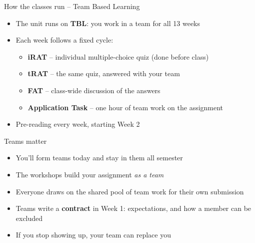 \documentclass[
  ignorenonframetext,
]{beamer}
\providecommand{\tightlist}{%
  \setlength{\itemsep}{0pt}\setlength{\parskip}{0pt}}
\begin{document}
\begin{frame}{How the classes run -- Team Based Learning}
\label{how-the-classes-run-team-based-learning}
\begin{itemize}
\tightlist
\item
  The unit runs on \textbf{TBL}: you work in a team for all 13 weeks
\item
  Each week follows a fixed cycle:

  \begin{itemize}
  \tightlist
  \item
    \textbf{iRAT} -- individual multiple-choice quiz (done before class)
  \item
    \textbf{tRAT} -- the same quiz, answered with your team
  \item
    \textbf{FAT} -- class-wide discussion of the answers
  \item
    \textbf{Application Task} -- one hour of team work on the assignment
  \end{itemize}
\item
  Pre-reading every week, starting Week 2
\end{itemize}

\end{frame}

\begin{frame}{Teams matter}
\label{teams-matter}
\begin{itemize}
\tightlist
\item
  You'll form teams today and stay in them all semester
\item
  The workshops build your assignment \emph{as a team}
\item
  Everyone draws on the shared pool of team work for their own
  submission
\item
  Teams write a \textbf{contract} in Week 1: expectations, and how a
  member can be excluded
\item
  If you stop showing up, your team can replace you
\end{itemize}

\end{frame}
\end{document}
